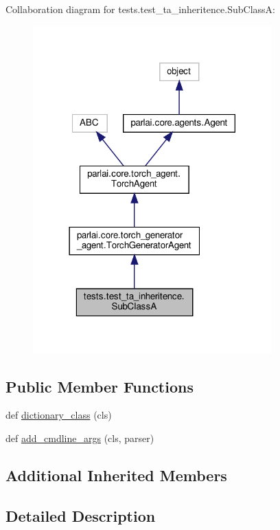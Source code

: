 Collaboration diagram for tests.\+test\+\_\+ta\+\_\+inheritence.\+Sub\+ClassA\+:
\nopagebreak
\begin{figure}[H]
\begin{center}
\leavevmode
\includegraphics[width=261pt]{de/dd9/classtests_1_1test__ta__inheritence_1_1SubClassA__coll__graph}
\end{center}
\end{figure}
\subsection*{Public Member Functions}
\begin{DoxyCompactItemize}
\item 
def \hyperlink{classtests_1_1test__ta__inheritence_1_1SubClassA_aa01b5f43121b539c377b9b1d50f93d0c}{dictionary\+\_\+class} (cls)
\item 
def \hyperlink{classtests_1_1test__ta__inheritence_1_1SubClassA_a088369e91c8005b70d20f17032998215}{add\+\_\+cmdline\+\_\+args} (cls, parser)
\end{DoxyCompactItemize}
\subsection*{Additional Inherited Members}


\subsection{Detailed Description}


